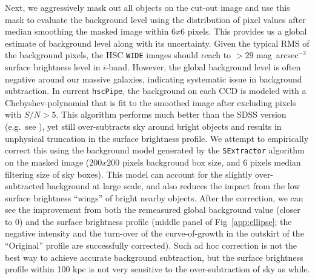 \documentclass{emulateapj}
\def\sb{mag~arcsec$^{-2}$}
\begin{document}
\begin{CJK*}{UTF8}{gbsn}
    Next, we aggressively mask out all objects on the cut-out image and use this mask
    to evaluate the background level using the distribution of pixel values after 
    median smoothing the masked image within $6x6$ pixels.
    This provides us a global estimate of background level along with its uncertainty. 
    Given the typical RMS of the background pixels, the HSC \texttt{WIDE} images 
    should reach to $> 29$ \sb surface brightness level in $i$-band.  
    However, the global background level is often negative around our massive 
    galaxies, indicating systematic issue in background subtraction.  
    In current \texttt{hscPipe}, the background on each CCD is modeled with a 
    Chebyshev-polynomial that is fit to the smoothed image after excluding pixels 
    with $S/N >5$.
    This algorithm performs much better than the SDSS version 
    (e.g.\ see \citealt{Blanton2011}), yet still over-subtracts sky around bright 
    objects and results in unphysical truncation in the surface brightness profile.
    We attempt to empirically correct this using the background model generated by 
    the \texttt{SExtractor} algorithm on the masked image 
    ($200x200$ pixels background box size, and 6 pixels median filtering size of 
    sky boxes).
    This model can account for the slightly over-subtracted background at large scale,
    and also reduces the impact from the low surface brightness ``wings'' of bright 
    nearby objects. 
    After the correction, we can see the improvement from both the remeasured global 
    background value (closer to 0) and the surface brightness profile (middle panel 
    of Fig~\ref{app:ellipse}; the negative intensity and the turn-over of the 
    curve-of-growth in the outskirt of the ``Original'' profile are successfully 
    corrected). 
    Such ad hoc correction is not the best way to achieve accurate background 
    subtraction, but the surface brightness profile within 100 kpc is not very
    sensitive to the over-subtraction of sky as while. 
    

\end{CJK*}
\end{document}
